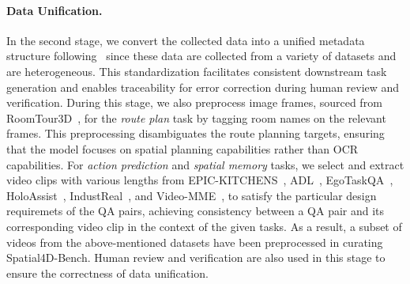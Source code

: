 \paragraph{Data Unification.}
In the second stage, we convert the collected data into a unified metadata structure following~\cite{Yang_2025_CVPR} since these data are collected from a variety of datasets and are heterogeneous.
This standardization facilitates consistent downstream task generation and enables traceability for error correction during human review and verification.
During this stage, we also preprocess image frames, sourced from RoomTour3D~\cite{han2025roomtour3d}, for the \textit{route plan} task by tagging room names on the relevant frames.
This preprocessing disambiguates the route planning targets, ensuring that the model focuses on spatial planning capabilities rather than OCR capabilities. For \textit{action prediction} and \textit{spatial memory} tasks, we select and extract video clips with various lengths from EPIC-KITCHENS~\cite{Damen2018EPICKITCHENS}, ADL~\cite{youhome2022}, EgoTaskQA~\cite{jia2022egotaskqa}, HoloAssist~\cite{wang2023holoassist}, IndustReal~\cite{schoonbeek2024industreal}, and Video-MME~\cite{fu2024video}, to satisfy the particular design requiremets of the QA pairs, achieving consistency between a QA pair and its corresponding video clip in the context of the given tasks. As a result, a subset of videos from the above-mentioned datasets have been preprocessed in curating Spatial4D-Bench.
Human review and verification are also used in this stage to ensure the correctness of data unification.




